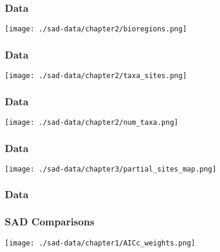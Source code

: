 \documentclass[17pt]{beamer}
\begin{document}

\begin{frame}{}
\frametitle{Data}
\texttt{[image: ./sad-data/chapter2/bioregions.png]}
\end{frame}

\begin{frame}{}
\frametitle{Data}
\texttt{[image: ./sad-data/chapter2/taxa\_sites.png]}
\end{frame}

\begin{frame}{}
\frametitle{Data}
\texttt{[image: ./sad-data/chapter2/num\_taxa.png]}
\end{frame}

\begin{frame}{}
\frametitle{Data}
\texttt{[image: ./sad-data/chapter3/partial\_sites\_map.png]}
\end{frame}

\begin{frame}{}
\frametitle{Data}
\end{frame}


\begin{frame}{}
\frametitle{SAD Comparisons}
\texttt{[image: ./sad-data/chapter1/AICc\_weights.png]}
\end{frame}
\end{document}
